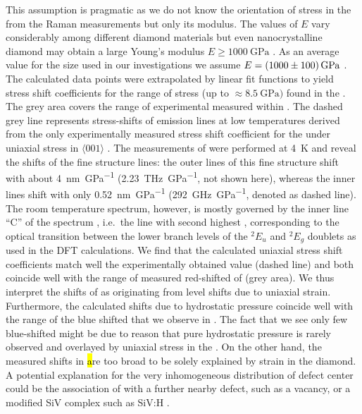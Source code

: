 	This assumption is pragmatic as we do not know the orientation of stress in the \nds from the Raman measurements but only its modulus. The values of $E$ vary considerably among different diamond materials \cite{hess2012mechanical} but even nanocrystalline diamond may obtain a large Young’s modulus $E \geq \SI{1000}{\GPa}$ \cite{williams2010high}. As an average value for the \nd size used in our investigations we assume $E = \SI[separate-uncertainty]{1000+-100}{\GPa}$ \cite{hess2012mechanical}. The calculated data points were extrapolated by linear fit functions to yield stress shift coefficients for the range of stress (up to $\approx \SI{8.5}{\GPa})$ found in the \nds. The grey area covers the \wl range of experimental \ZPL \wls measured within \vl. The dashed grey line represents stress-shifts of \siv emission lines at low temperatures derived from the only experimentally measured stress shift coefficient for the \siv under uniaxial stress in $\langle 001 \rangle$ \cite{Sternschulte1994,Hepp2014}. 
	The measurements of \cite{Sternschulte1994} were performed at \SI{4}{\kelvin} and reveal the shifts of the \siv fine structure lines: the outer lines of this fine structure shift with about \SI{4}{\nm\per\GPa} (\SI{2.23}{\THz\per\GPa}, not shown here), whereas the inner lines shift with only \SI{0.52}{\nm\per\GPa} (\SI{292}{\GHz\per\GPa}, denoted as dashed line). The room temperature spectrum, however, is mostly governed by the inner line ``C'' of the spectrum \cite{Arend2016a}, i.e.\ the line with second highest \wl, corresponding to the optical transition between the lower branch levels of the ${}^{2}E_{u}$ and ${}^{2}E_{g}$ doublets as used in the DFT calculations. We find that the calculated uniaxial stress shift coefficients match well the experimentally obtained value (dashed line) and both coincide well with the range of measured red-shifted \ZPLs of \vl (grey area). We thus interpret the \ZPL shifts of \vl as originating from level shifts due to uniaxial strain. 
	Furthermore, the calculated \ZPL shifts due to hydrostatic pressure coincide well with the range of the blue shifted \ZPLs that we observe in \vl. The fact that we see only few blue-shifted \ZPLs might be due to reason that pure hydrostatic pressure is rarely observed and overlayed by uniaxial stress in the \nds. 
	On the other hand, the measured shifts in \hl are too broad to be solely explained by strain in the diamond. A potential explanation for the very inhomogeneous distribution of defect center \ZPL \cwls could be the association of \sivs with a further nearby defect, such as a vacancy, or a modified SiV complex such as SiV:H \cite{Thiering2015}.


